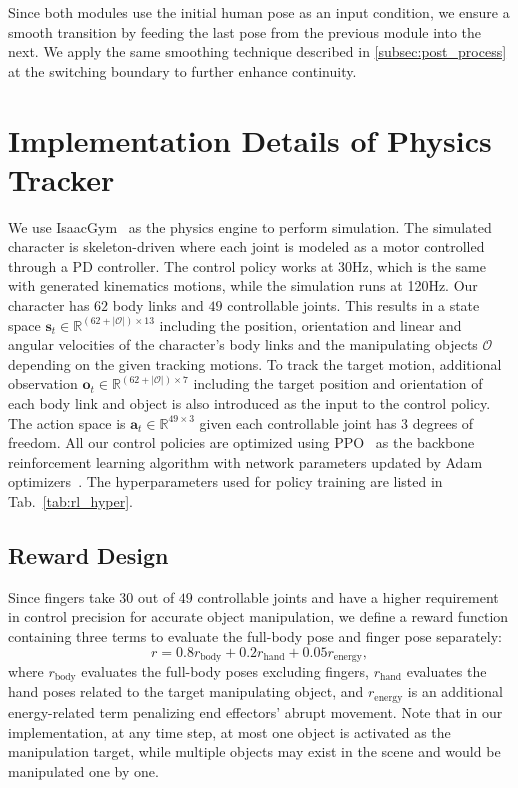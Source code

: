 Since both modules use the initial human pose as an input condition, we ensure a smooth transition by feeding the last pose from the previous module into the next.
We apply the same smoothing technique described in \cref{subsec:post_process} at the switching boundary to further enhance continuity.


\section{Implementation Details of Physics Tracker}
We use IsaacGym~\cite{makoviychuk2021isaac} as the physics engine to perform simulation.
The simulated character is skeleton-driven where each joint is modeled as a motor controlled through a PD controller.
The control policy works at 30Hz, which is the same with generated kinematics motions, while the simulation runs at 120Hz.
Our character has $62$ body links and $49$ controllable joints.
This results in a state space $\mathbf{s}_t \in \mathbb{R}^{(62+|\mathcal{O}|)\times 13}$ including the position, orientation and linear and angular velocities of the character's body links and the manipulating objects $\mathcal{O}$ depending on the given tracking motions.
To track the target motion,
additional observation $\mathbf{o}_t \in \mathbb{R}^{(62+|\mathcal{O}|)\times7}$ including the target position and orientation of each body link and object is also introduced as the input to the control policy.
The action space is $\mathbf{a}_t \in \mathbb{R}^{49\times3}$ given each controllable joint has 3 degrees of freedom.
All our control policies are optimized using PPO~\cite{schulman2017proximal} as the backbone reinforcement learning algorithm with network parameters updated by Adam optimizers~\cite{kingma2014adam}.
The hyperparameters used for policy training are listed in Tab.~\ref{tab:rl_hyper}.

\subsection{Reward Design}
Since fingers take $30$ out of $49$ controllable joints and have a higher requirement in control precision for accurate object manipulation, we define a reward function containing three terms to evaluate the full-body pose and finger pose separately:
\begin{equation}
    r = 0.8 r_\text{body} + 0.2 r_\text{hand} + 0.05 r_\text{energy},
\end{equation}
where $r_\text{body}$ evaluates the full-body poses excluding fingers, $r_\text{hand}$ evaluates the hand poses related to the target manipulating object,
and $r_\text{energy}$ is an additional energy-related term penalizing end effectors' abrupt movement.
Note that in our implementation, at any time step,
at most one object is activated as the manipulation target, while multiple objects may exist in the scene and would be manipulated one by one.

